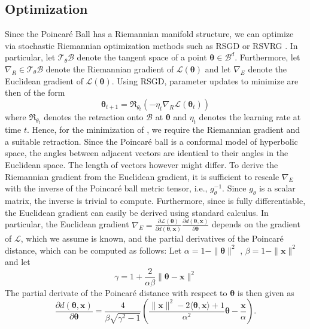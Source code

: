 \documentclass[11pt]{article}
\renewcommand{\vec}[1]{\bm{#1}}
\newcommand{\vt}{\vec{\theta}}
\newcommand{\vx}{\vec{x}}
\newcommand{\lossfn}{\mathcal{L}}
\newcommand{\manifold}[1]{\mathcal{#1}}
\newcommand{\tansp}{\mathcal{T}}
\newcommand{\tanspt}{\tansp_{\theta} \manifold{B}}
\newcommand{\retract}{\mathfrak{R}}
\begin{document}
\subsection{Optimization}
\label{sec:optim}
Since the Poincaré Ball has a Riemannian manifold structure, we can optimize
 via stochastic Riemannian optimization methods such as RSGD
\cite{optimization/bonnabel2013stochastic} or RSVRG
\cite{optimization/zhang2016Riemannian}. In particular, let \(\tanspt\) denote the
tangent space of a point \(\vt \in \manifold{B}^d\). Furthermore, let \({\nabla_R \in
\tanspt}\) denote the Riemannian gradient of \(\lossfn(\vt)\) and let \(\nabla_E\)
denote the Euclidean gradient of \(\lossfn(\vt)\). Using RSGD, parameter
updates to minimize  are then of the form
\begin{equation*}
  \vt_{t+1} = \retract_{\theta_t}\left(-\eta_t \nabla_R \lossfn(\vt_t) \right)
\end{equation*}
where \(\retract_{\theta_t}\) denotes the retraction onto \(\manifold{B}\) at \(\vt\) and
\(\eta_t\) denotes the learning rate at time \(t\). Hence, for the minimization of
, we require the Riemannian gradient and a suitable retraction.
Since the Poincaré ball is a conformal model of hyperbolic space, the angles
between adjacent vectors are identical to their angles in the Euclidean space.
The length of vectors however might differ. To derive the Riemannian gradient
from the Euclidean gradient, it is sufficient to rescale \(\nabla_E\) with the inverse
of the Poincaré ball metric tensor, i.e., \(g^{-1}_\theta\). Since \(g_\theta\) is a
scalar matrix, the inverse is trivial to compute. Furthermore, since
 is fully differentiable, the Euclidean gradient can easily be
derived using standard calculus. In particular, the Euclidean gradient \(\nabla_E =
\frac{\partial \lossfn(\vt)}{\partial d(\vt, \vx)} \frac{\partial d(\vt, \vx)}{\partial \vt}\) depends on the
gradient of \(\lossfn\), which we assume is known, and the partial derivatives of
the Poincaré distance, which can be computed as follows: Let \(\alpha = 1 - \|\vt\|^2\)
, \(\beta = 1 - \|\vx\|^2\) and let
\begin{equation}
  \gamma = 1 + \frac{2}{\alpha \beta} \|\vt -\vx\|^2
\end{equation}
The partial derivate of the Poincaré distance with respect to \(\vt\) is then given as
\begin{equation}
  \frac{\partial d(\vt, \vx)}{\partial \vt} = \frac{4}{\beta \sqrt{\gamma^2 - 1}} \left(\frac{\|\vx\|^2 - 2\langle\vt, \vx\rangle + 1}{\alpha^2} \vt - \frac{\vx}{\alpha} \right) . \label{eq:partial}
\end{equation}
\end{document}

